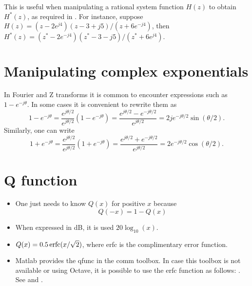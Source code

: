 This is useful when manipulating a rational system function $H(z)$ to obtain $H^*(z)$, as required in . For instance, suppose $H(z) = (z-2e^{j4}) (z-3+j5) / (z+6e^{-j4})$, then $H^*(z) = (z^*-2e^{-j4}) (z^*-3-j5) / (z^*+6e^{j4})$.

\section{Manipulating complex exponentials}
In Fourier and Z transforms it is common to encounter expressions such as $1 - e^{-j \theta}$. In some cases it is convenient to rewrite them as
\begin{equation}
1 - e^{-j \theta} = \frac{e^{j \theta/2}}{e^{j \theta/2}} (1 - e^{-j \theta}) = \frac{e^{j \theta/2} - e^{-j \theta/2}}{e^{j \theta/2}} = 2 j e^{-j \theta/2} \sin(\theta/2).
\label{eq:complex_exp_trick_sin}
\end{equation}
Similarly, one can write
\begin{equation}
1 + e^{-j \theta} = \frac{e^{j \theta/2}}{e^{j \theta/2}} (1 + e^{-j \theta}) = \frac{e^{j \theta/2} + e^{-j \theta/2}}{e^{j \theta/2}} = 2  e^{-j \theta/2} \cos(\theta/2).
\label{eq:complex_exp_trick_cos}
\end{equation}

\section{Q function}
\label{sec:qfunction}

\begin{itemize}
	\item One just needs to know $Q(x)$ for positive $x$ because
\begin{equation}
Q(-x) = 1 - Q(x)
\label{eq:qfunctionSymmetry}
\end{equation}	
	\item When expressed in dB, it is used $20 \log_{10} (x)$.
	\item $Q(x) = 0.5 \textrm{\,erfc}(x/\sqrt{2})$, where erfc is the complimentary error function.
	\item Matlab provides the qfunc in the comm toolbox. In case this toolbox is not available or using Octave, it is possible to use the erfc function as follows: . See  and .
\end{itemize}

